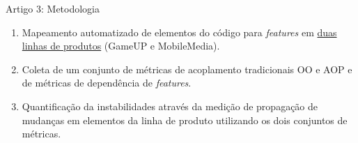 
\begin{frame}{Artigo 3: Metodologia}
  \begin{enumerate}      
    \item \alert{Mapeamento} automatizado de \alert{elementos do código} para \alert{\textit{features}} em \underline{duas linhas de produtos} (GameUP e MobileMedia).
    \item Coleta de um conjunto de \alert{métricas} de acoplamento \alert{tradicionais} OO e AOP e de \alert{métricas} de dependência de \alert{\textit{features}}.
 
    \item Quantificação da \alert{instabilidades} através da medição de \alert{propagação de mudanças} em elementos  da linha de produto utilizando os \alert{dois} conjuntos de métricas.
  \end{enumerate} 
\end{frame}